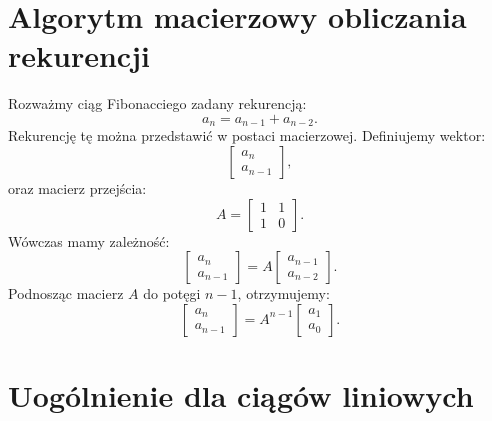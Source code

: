 \documentclass[12pt]{article}
\begin{document}
\section{Algorytm macierzowy obliczania rekurencji}

Rozważmy ciąg Fibonacciego zadany rekurencją:
\[
a_n = a_{n-1} + a_{n-2}.
\]
Rekurencję tę można przedstawić w postaci macierzowej. Definiujemy wektor:
\[
\begin{bmatrix} a_n \\ a_{n-1} \end{bmatrix},
\]
oraz macierz przejścia:
\[
A = \begin{bmatrix} 1 & 1 \\ 1 & 0 \end{bmatrix}.
\]
Wówczas mamy zależność:
\[
\begin{bmatrix} a_n \\ a_{n-1} \end{bmatrix} = A \begin{bmatrix} a_{n-1} \\ a_{n-2} \end{bmatrix}.
\]
Podnosząc macierz \(A\) do potęgi \(n-1\), otrzymujemy:
\[
\begin{bmatrix} a_n \\ a_{n-1} \end{bmatrix} = A^{n-1} \begin{bmatrix} a_1 \\ a_0 \end{bmatrix}.
\]

\section*{Uogólnienie dla ciągów liniowych}
\end{document}
